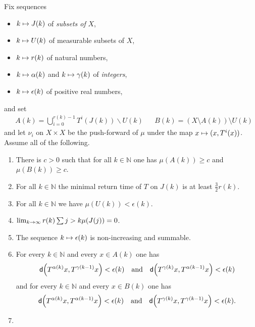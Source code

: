 \documentclass[AHL,Unicode,longabstracts,published]{cedram}
\newcommand{\N}{\mathbb{N}}
\newcommand{\metric}{\mathsf{d}}
\let\originalleft\left
\let\originalright\right
\renewcommand{\left}{\mathopen{}\mathclose\bgroup\originalleft}
\renewcommand{\right}{\aftergroup\egroup\originalright}
\renewcommand*{\to}{\mathchoice{\longrightarrow}{\rightarrow}{\rightarrow}{\rightarrow}}
\let\oldmapsto\mapsto
\renewcommand*{\mapsto}{\mathchoice{\longmapsto}{\oldmapsto}{\oldmapsto}{\oldmapsto}}
\newcommand*{\relabel}{\renewcommand{\labelenumi}{(\theenumi)}}
\newcommand*{\Jenumi}{\renewcommand*{\theenumi}{J\arabic{enumi}}\relabel}
\begin{document}
\pagebreak{}

\begin{prop}\label{prop:ce}
Fix sequences
\begin{itemize}
\item $k \mapsto J(k)$ of \emph{subsets of} $X$,
\item $k \mapsto U(k)$ of measurable subsets of $X$,
\item $k \mapsto r(k)$ of natural numbers,
\item $k \mapsto \alpha(k)$ and $k \mapsto \gamma(k)$ of \emph{integers},
\item $k \mapsto \epsilon(k)$ of positive real numbers,
\end{itemize}
and set
\begin{align}\label{eq:U only bad}
&A(k) = \bigcup_{i=0}^{r(k)-1} T^i (J(k)) \backslash U(k)
&&B(k) = (X \setminus A(k)) \setminus U(k)
\end{align}
and let $\nu_i$ on $X \times X$ be the push-forward of $\mu$ under the map $x \mapsto (x, T^i(x))$. Assume all of the following.
\begin{enumerate}\Jenumi
\item\label{ce:proportion}
There is $c > 0$ such that for all $k \in \N$ one has $\mu(A(k)) \ge c$ and $\mu(B(k)) \ge c$.
\item\label{ce:return}
For all $k \in \N $ the minimal return time of $T$ on $J(k)$ is at least $\frac{3}{2} r(k)$.
\item\label{ce:discard}
For all $k \in \N$ we have $\mu(U(k)) < \epsilon(k)$.
\item\label{ce:shrinking}
$\lim_{k \to \infty} r(k) \sum{j > k} \mu(J(j)) = 0$.
\item\label{ce:error}
The sequence $k \mapsto \epsilon(k)$ is non-increasing and summable.
\item\label{ce:nearness}
For every $k \in \N$ and every $x \in A(k)$ one has
\begin{equation}\label{ce:nearness_1}
\metric\left(T^{\alpha(k)} x, T^{\gamma(k-1)} x\right) < \epsilon(k)
\quad \text{and} \quad
\metric\left(T^{\gamma(k)} x, T^{\alpha(k-1)} x\right) < \epsilon(k)
\end{equation}
and for every $k \in \N$ and every $x \in B(k)$ one has
\begin{equation}\label{ce:nearness_2}
\metric\left(T^{\alpha(k)} x, T^{\alpha(k-1)} x\right) < \epsilon(k)
\quad\text{and}\quad
\metric\left(T^{\gamma(k)} x, T^{\gamma(k-1)} x\right) < \epsilon(k).
\end{equation}
\item\label{ce:kr}

\end{enumerate}
\end{prop}
\end{document}
